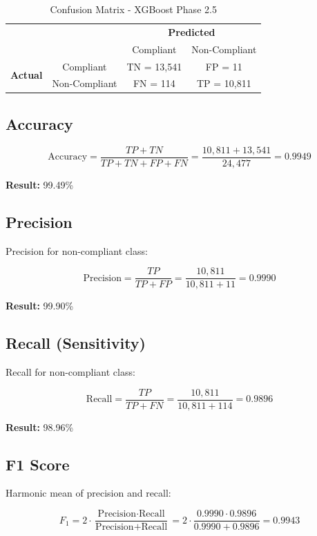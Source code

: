 \documentclass[12pt,a4paper]{article}
\begin{document}
\begin{table}[h]
\centering
\begin{tabular}{cc|cc}
& & \multicolumn{2}{c}{\textbf{Predicted}} \\
& & Compliant & Non-Compliant \\
\hline
\multirow{2}{*}{\textbf{Actual}} & Compliant & TN = 13{,}541 & FP = 11 \\
& Non-Compliant & FN = 114 & TP = 10{,}811 \\
\end{tabular}
\caption{Confusion Matrix - XGBoost Phase 2.5}
\end{table}

\subsection{Accuracy}

$$\text{Accuracy} = \frac{TP + TN}{TP + TN + FP + FN} = \frac{10{,}811 + 13{,}541}{24{,}477} = 0.9949$$

\textbf{Result:} 99.49\%

\subsection{Precision}

Precision for non-compliant class:

$$\text{Precision} = \frac{TP}{TP + FP} = \frac{10{,}811}{10{,}811 + 11} = 0.9990$$

\textbf{Result:} 99.90\%

\subsection{Recall (Sensitivity)}

Recall for non-compliant class:

$$\text{Recall} = \frac{TP}{TP + FN} = \frac{10{,}811}{10{,}811 + 114} = 0.9896$$

\textbf{Result:} 98.96\%

\subsection{F1 Score}

Harmonic mean of precision and recall:

$$F_1 = 2 \cdot \frac{\text{Precision} \cdot \text{Recall}}{\text{Precision} + \text{Recall}} = 2 \cdot \frac{0.9990 \cdot 0.9896}{0.9990 + 0.9896} = 0.9943$$
\end{document}
